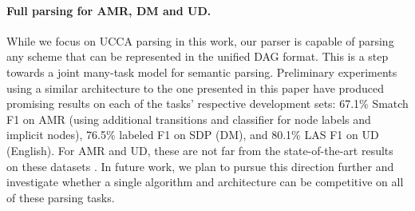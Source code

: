 \documentclass[11pt,a4paper]{article}
\begin{document}
\paragraph{Full parsing for AMR, DM and UD.}
While we focus on UCCA parsing in this work, our parser is capable of parsing any
scheme that can be represented in the unified DAG format.
This is a step towards a joint many-task model for semantic parsing.
Preliminary experiments using a similar architecture to the one presented in this paper have produced
promising results on each of the tasks' respective development sets:
67.1\% Smatch F1 \cite{cai2013smatch} on AMR
(using additional transitions and classifier for node labels and implicit nodes),
76.5\% labeled F1 on SDP (DM),
and 80.1\% LAS F1 on UD (English).
For AMR and UD, these are not far from the state-of-the-art results on these datasets
\cite{foland2017abstract,dozat2016deep}.
In future work, we plan to pursue this direction further and investigate whether a single
algorithm and architecture can be competitive on all of these parsing tasks.





\end{document}
